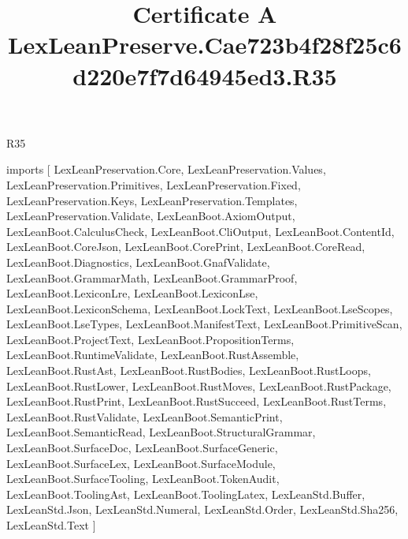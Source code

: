 \begin{lexlean}{R35}
\title{Certificate A LexLeanPreserve.Cae723b4f28f25c6d220e7f7d64945ed3.R35}
\begin{coremodule}
imports [
  LexLeanPreservation.Core,
  LexLeanPreservation.Values,
  LexLeanPreservation.Primitives,
  LexLeanPreservation.Fixed,
  LexLeanPreservation.Keys,
  LexLeanPreservation.Templates,
  LexLeanPreservation.Validate,
  LexLeanBoot.AxiomOutput,
  LexLeanBoot.CalculusCheck,
  LexLeanBoot.CliOutput,
  LexLeanBoot.ContentId,
  LexLeanBoot.CoreJson,
  LexLeanBoot.CorePrint,
  LexLeanBoot.CoreRead,
  LexLeanBoot.Diagnostics,
  LexLeanBoot.GnafValidate,
  LexLeanBoot.GrammarMath,
  LexLeanBoot.GrammarProof,
  LexLeanBoot.LexiconLre,
  LexLeanBoot.LexiconLse,
  LexLeanBoot.LexiconSchema,
  LexLeanBoot.LockText,
  LexLeanBoot.LseScopes,
  LexLeanBoot.LseTypes,
  LexLeanBoot.ManifestText,
  LexLeanBoot.PrimitiveScan,
  LexLeanBoot.ProjectText,
  LexLeanBoot.PropositionTerms,
  LexLeanBoot.RuntimeValidate,
  LexLeanBoot.RustAssemble,
  LexLeanBoot.RustAst,
  LexLeanBoot.RustBodies,
  LexLeanBoot.RustLoops,
  LexLeanBoot.RustLower,
  LexLeanBoot.RustMoves,
  LexLeanBoot.RustPackage,
  LexLeanBoot.RustPrint,
  LexLeanBoot.RustSucceed,
  LexLeanBoot.RustTerms,
  LexLeanBoot.RustValidate,
  LexLeanBoot.SemanticPrint,
  LexLeanBoot.SemanticRead,
  LexLeanBoot.StructuralGrammar,
  LexLeanBoot.SurfaceDoc,
  LexLeanBoot.SurfaceGeneric,
  LexLeanBoot.SurfaceLex,
  LexLeanBoot.SurfaceModule,
  LexLeanBoot.SurfaceTooling,
  LexLeanBoot.TokenAudit,
  LexLeanBoot.ToolingAst,
  LexLeanBoot.ToolingLatex,
  LexLeanStd.Buffer,
  LexLeanStd.Json,
  LexLeanStd.Numeral,
  LexLeanStd.Order,
  LexLeanStd.Sha256,
  LexLeanStd.Text
]


\end{coremodule}
\end{lexlean}

